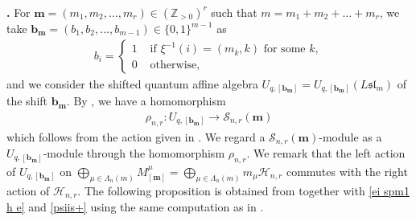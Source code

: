 \documentclass[12pt]{amsart}
\def \para{\refstepcounter{thm} \par\medskip\noindent
                \textbf{\thethm .} }
\numberwithin{equation}{thm}
\newcommand\ZZ{\mathbb Z}
\newcommand\bb{\mathbf b}
\renewcommand\bm{\mathbf m} %
\newcommand\sH{\mathscr H}
\newcommand\sS{\mathscr S}
\newcommand\vL{\varLambda}
\newcommand\ra{\rightarrow}
\newcommand\Fsl{\mathfrak{sl}}
\newcounter{go}
\begin{document}
\para \label{uqnnm Scnr} 
For $\bm =(m_1,m_2,\dots, m_r) \in (\ZZ_{>0})^r$ such that $m=m_1+m_2+\dots + m_r$, 
we take $\bb_{\bm} =(b_1,b_2,\dots, b_{m-1}) \in \{0,1\}^{m-1}$ as 
\begin{align*}
b_i = \begin{cases} 
	1 & \text{ if } \xi^{-1} (i) = (m_k,k) \text{ for some } k, 
	\\
	0 & \text{ otherwise}, 
\end{cases} 
\end{align*}
and we consider the shifted quantum affine algebra $U_{q,[\bb_{\bm}]}= U_{q,[\bb_{\bm}]} (L \Fsl_m)$ of the shift $\bb_{\bm}$. 
By \cite[(8.6.2) and Corollary 8.8]{Wad24}, we have a homomorphism 
\begin{align*}
\rho_{n,r} : U_{q,[\bb_{\bm}]} \ra \sS_{n,r}(\bm)
\end{align*} 
which follows from the action given in \cite[Proposition 8.7]{Wad24}.  
We  regard a $\sS_{n,r}(\bm)$-module as a $U_{q,[\bb_{\bm}]}$-module through the homomorphism $\rho_{n,r}$. 
We remark that the left action of $U_{q,[\bb_{\bm}]}$ on 
$\bigoplus_{\mu \in \vL_n(m)} M_{[\bm]}^{\mu} = \bigoplus_{\mu \in \vL_n(m)} m_{\mu} \sH_{n,r}$ 
commutes with the right action of $\sH_{n,r}$.  
%
The following proposition is obtained from \cite[Proposition 8.7]{Wad24} together with \eqref{ei spm1 h e} and \eqref{psiis+} 
using the same computation as in \cite[\S7]{Wad16}. 
\end{document}
